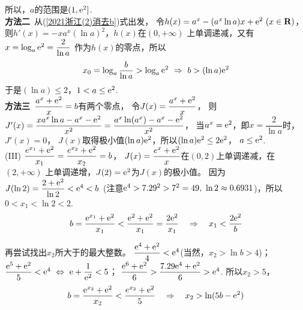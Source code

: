 \begin{enumerate}[label={【\textbf{例\thechapter.\arabic*}】},
 leftmargin=\inteval{\myenumleftmargin}pt,
 itemsep=\inteval{\myenumitempsep}pt,
 itemindent=\inteval{\myenumitemindent}pt]
所以，$ a $的范围是$ (1,\mathrm{e}^2] $. \\
\textbf{方法二}\ 从(\ref{2021浙江(2)消去b})式出发，
令$ h(x)=a^{x}-(a^{x}\ln a)x+\mathrm{e}^2\ (x\in \textbf{R}) $，
则$ h'(x)=-xa^x(\ln a)^2 $，$ h(x) $在$ (0,+\infty) $
上单调递减，又有$ x=\log_a \mathrm{e}^2=\dfrac{2}{\ln a} $
作为$ h(x) $的零点，所以
\begin{gather*}
    x_0=\log_a\dfrac{b}{\ln a}> \log_a \e^2\ 
    \Rightarrow\  b>(\ln a)\e^2
\end{gather*}
于是$ (\ln a)\leq 2 $，$ 1<a\leq \mathrm{e}^2 $. \\
\textbf{方法三}\ $ \dfrac{a^x+\mathrm{e}^2}{x}=b $有两个零点，
令$ J(x)=\dfrac{a^x+\mathrm{e}^2}{x} $，
则$ J'(x)=\dfrac{xa^x\ln a-a^x-\mathrm{e}^2}{x^2}=
\dfrac{a^x\ln (a^x)-a^x-\mathrm{e}^2}{x^2} $，
当$ a^x=\mathrm{e}^2 $，即$ x=\dfrac{2}{\ln a} $时，$ J'(x)=0 $，
$ J(x) $取得极小值$ (\ln a)\mathrm{e}^2 $，所以$ (\ln a)\mathrm{e}^2\leq 2\mathrm{e}^2 $，
$ a\leq \mathrm{e}^2 $. \\
(III) $ \dfrac{e^{x_1}+\mathrm{e}^2}{x_1}=\dfrac{e^{x_2}+\mathrm{e}^2}{x_2}=b $，
$ J(x)=\dfrac{e^x+\mathrm{e}^2}{x} $在$ (0,2) $上单调递减，在$ (2,+\infty) $
上单调递增，$ J(2)=\mathrm{e}^2 $为$ J(x) $的极小值。
因为$ J(\ln 2)=\dfrac{2+\mathrm{e}^2}{\ln 2}<\mathrm{e}^4<b $\ 
(注意$ \mathrm{e}^4>7.29^2>7^2=49,\ \ln2\approx 0.6931 $)，所以$ 0<x_1<\ln 2<2 $.
\begin{gather*}
    b=\dfrac{\mathrm{e}^{x_1}+\mathrm{e}^2}{x_1}<\dfrac{\mathrm{e}^2+\mathrm{e}^2}{x_1}
    =\dfrac{2\mathrm{e}^2}{x_1}\quad \Rightarrow \quad x_1<\dfrac{2\mathrm{e}^2}{b}
\end{gather*}

再尝试找出$ x_2 $所大于的最大整数。
$ \dfrac{\mathrm{e}^4+\mathrm{e}^2}{4}<\mathrm{e}^4 $(当然，$ x_2>\ln b>4 $)；
$ \dfrac{\e^5+\e^2}{5}<\e^4\ \Leftrightarrow\ 
\e+\dfrac{1}{\e^2}<5 $；
$ \dfrac{\mathrm{e}^6+\mathrm{e}^2}{6}>\dfrac{7.29\mathrm{e}^4+\mathrm{e}^2}{6}>\mathrm{e}^4 $. 
所以$ x_2>5 $，
\begin{gather*}
    b=\dfrac{\mathrm{e}^{x_2}+\mathrm{e}^2}{x_2}<\dfrac{e^{x_2}+\mathrm{e}^2}{5} \quad
    \Rightarrow\quad x_2>\ln(5b-\mathrm{e}^2)
\end{gather*}


\end{enumerate}
